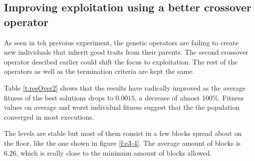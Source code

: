 \documentclass[sigconf]{acmart}
\begin{document}
\subsection{Improving exploitation using a better crossover operator}\label{E3}
As seen in teh prevoius experiment, the genetic operators are failing to 
create new individuals that inherit good traits from their parents. The second 
crossover operator descibed earlier could shift the focus to exploitation.
The rest of the operators as 
well as the termination criteria are kept the same. 

Table \ref{t:resOver2} shows that the results have radically improved as the 
average fitness of the best solutions drops to $0.0015$, a decrease of almost 
100\%. Fitness values on average and worst individual fitness suggest that the
the population converged in most executions. 

The levels are stable but 
most of them consist in a 
few blocks spread about on the floor, like the one shown in figure \ref{f:e3-4}.
The average amount of blocks is $6.26$, 
which is really close to the minimum amount of blocks allowed.

\end{document}
